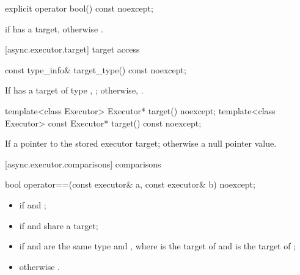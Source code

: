 %
\begin{itemdecl}
explicit operator bool() const noexcept;
\end{itemdecl}

\begin{itemdescr}
\pnum
\returns {} if  has a target, otherwise .
\end{itemdescr}



[async.executor.target]{ target access}

%
\begin{itemdecl}
const type_info& target_type() const noexcept;
\end{itemdecl}

\begin{itemdescr}
\pnum
\returns If  has a target of type , ; otherwise, .
\end{itemdescr}

%
\begin{itemdecl}
template<class Executor> Executor* target() noexcept;
template<class Executor> const Executor* target() const noexcept;
\end{itemdecl}

\begin{itemdescr}
\pnum
\returns If  a pointer to the stored executor target; otherwise a null pointer value.
\end{itemdescr}



[async.executor.comparisons]{ comparisons}

%
\begin{itemdecl}
bool operator==(const executor& a, const executor& b) noexcept;
\end{itemdecl}

\begin{itemdescr}
\pnum
\returns
\begin{itemize}
\item
{} if  and ;
\item
{} if  and  share a target;
\item
{} if  and  are the same type and , where  is the target of  and  is the target of ;
\item
 otherwise .
\end{itemize}
\end{itemdescr}

